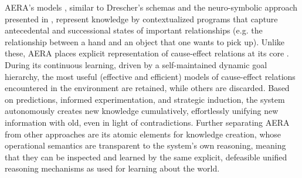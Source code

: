 \documentclass[runningheads]{llncs}
\begin{document}

AERA’s models \cite{thorisson2019cumulative,thorisson2014autonomous,nivel2013autocatalytic}, similar to Drescher’s schemas \cite{drescher_made-up_1991} and the neuro-symbolic approach presented in \cite{komrusch_symbolic_2022}, represent knowledge by contextualized programs that capture antecedental and successional states of important relationships (e.g. the relationship between a hand and an object that one wants to pick up). 
Unlike these, AERA places explicit representation of cause-effect relations at its core \cite{thorisson2018cumulative}. 
During its continuous learning, driven by a self-maintained dynamic goal hierarchy, the most useful (effective and efficient) models of cause-effect relations encountered in the environment are retained, while others are discarded. 
Based on predictions, informed experimentation, and strategic induction, the system autonomously creates new knowledge cumulatively, effortlessly unifying new information with old, even in light of contradictions. Further separating AERA from other approaches are its atomic elements for knowledge creation, whose operational semantics are transparent to the system’s own reasoning, meaning that they can be inspected and learned by the same explicit, defeasible unified reasoning mechanisms as used for learning about the world. 

\end{document}
